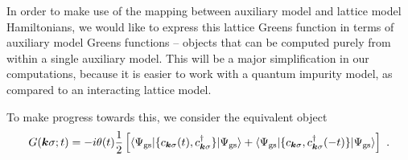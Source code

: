 In order to make use of the mapping between auxiliary model and lattice model Hamiltonians, we would like to express this lattice Greens function in terms of auxiliary model Greens functions -- objects that can be computed purely from within a single auxiliary model. This will be a major simplification in our computations, because it is easier to work with a quantum impurity model, as compared to an interacting lattice model.

To make progress towards this, we consider the equivalent object
\begin{equation}\begin{aligned}\label{retarded-full}
	G({\bm k}\sigma; t) = -i\theta(t) \frac{1}{2}\left[\braket{\Psi_\text{gs} | \{ c_{{\bm k}\sigma}(t), c^\dagger_{{\bm k}\sigma} \} | \Psi_\text{gs}} + \braket{\Psi_\text{gs} | \{ c_{{\bm k}\sigma}, c^\dagger_{{\bm k}\sigma}(-t) \} | \Psi_\text{gs}}\right]~.
\end{aligned}\end{equation}

